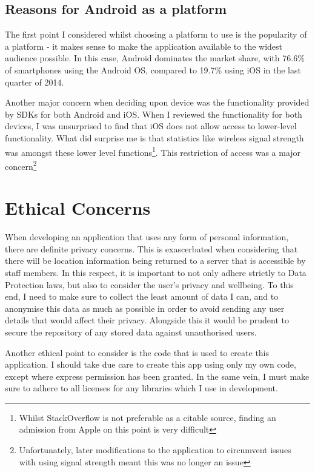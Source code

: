 \documentclass[11pt]{informatics-report}
\begin{document}
\subsection{Reasons for Android as a platform}

The first point I considered whilst choosing a platform to use is the popularity of a platform - it makes sense to make the application available to the widest audience possible. In this case, Android dominates the market share, with 76.6\% of smartphones using the Android OS, compared to 19.7\% using iOS in the last quarter of 2014\cite{devicestats}.

Another major concern when deciding upon device was the functionality provided by SDKs for both Android and iOS. When I reviewed the functionality for both devices, I was unsurprised to find that iOS does not allow access to lower-level functionality. What did surprise me is that statistics like wireless signal strength was amongst these lower level functions\cite{ios1}\cite{ios2}\footnote{Whilst StackOverflow is not preferable as a citable source, finding an admission from Apple on this point is very difficult}. This restriction of access was a major concern\footnote{Unfortunately, later modifications to the application to circumvent issues with using signal strength meant this was no longer an issue}

\section{Ethical Concerns}

When developing an application that uses any form of personal information, there are definite privacy concerns. This is exascerbated when considering that there will be location information being returned to a server that is accessible by staff members. In this respect, it is important to not only adhere strictly to Data Protection laws, but also to consider the user's privacy and wellbeing. To this end, I need to make sure to collect the least amount of data I can, and to anonymise this data as much as possible in order to avoid sending any user details that would affect their privacy. Alongside this it would be prudent to secure the repository of any stored data against unauthorised users.

Another ethical point to consider is the code that is used to create this application. I should take due care to create this app using only my own code, except where express permission has been granted. In the same vein, I must make sure to adhere to all licenses for any libraries which I use in development.
\end{document}
